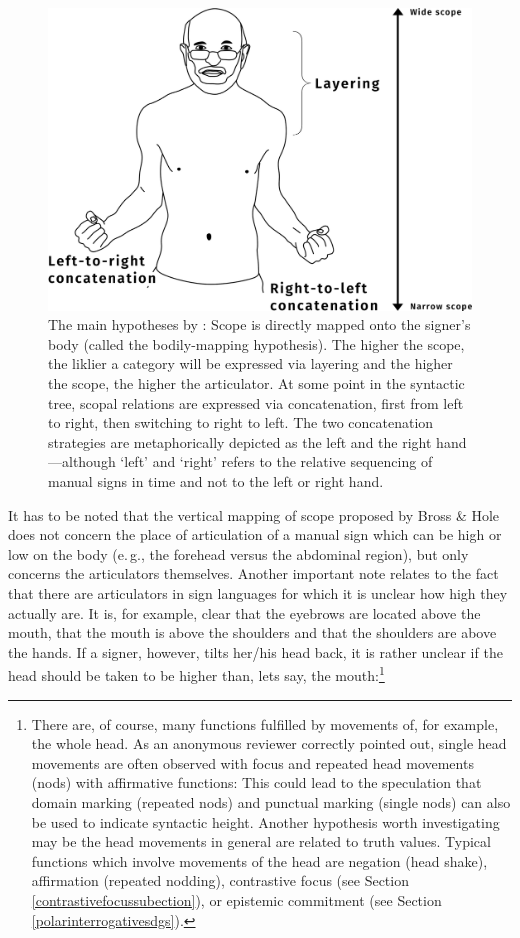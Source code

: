 \begin{figure}[bt]
\centering
	\includegraphics[width=1.0\textwidth]{hypo.jpg}
	\caption{The main hypotheses by \citet{bross2017scope}: Scope is directly mapped onto the signer's body (called the bodily-mapping hypothesis). The higher the scope, the liklier a category will be expressed via layering and the higher the scope, the higher the articulator. At some point in the syntactic tree, scopal relations are expressed via concatenation, first from left to right, then switching to right to left. The two concatenation strategies are metaphorically depicted as the left and the right hand---although `left' and `right' refers to the relative sequencing of manual signs in time and not to the left or right hand.}
	\label{hypo}
\end{figure}	

\noindent It has to be noted that the vertical mapping of scope proposed by Bross \& Hole does not concern the place of articulation of a manual sign which can be high or low on the body (e.\,g., the forehead versus the abdominal region), but only concerns the articulators themselves. Another important note relates to the fact that there are articulators in sign languages for which it is unclear how high they actually are. It is, for example, clear that the eyebrows are located above the mouth, that the mouth is above the shoulders and that the shoulders are above the hands. If a signer, however, tilts her/his head back, it is rather unclear if the head should be taken to be higher than, lets say, the mouth:\footnote{ There are, of course, many functions fulfilled by movements of, for example, the whole head. As an anonymous reviewer correctly pointed out, single head movements are often observed with focus and repeated head movements (nods) with affirmative functions: This could lead to the speculation that domain marking (repeated nods) and punctual marking (single nods) can also be used to indicate syntactic height. Another hypothesis worth investigating may be the head movements in general are related to truth values. Typical functions which involve movements of the head are negation (head shake), affirmation (repeated nodding), contrastive focus (see Section \ref{contrastivefocussubection}), or epistemic commitment (see Section \ref{polarinterrogativesdgs}).}\label{nesting}

